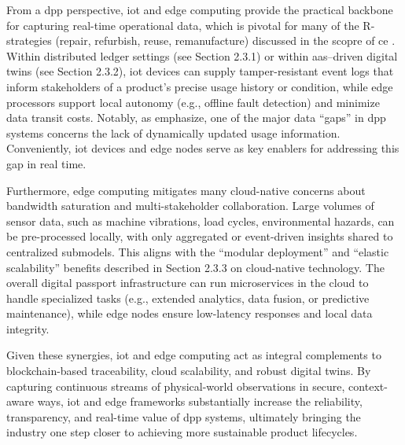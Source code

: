 From a \ac{dpp} perspective, \ac{iot} and edge computing provide the practical backbone for capturing real-time operational data, which is pivotal for many of the R-strategies (repair, refurbish, reuse, remanufacture) discussed in the scopre of \ac{ce} \autocite{DeutschesInstitutfurNormunge.V..2023}. Within distributed ledger settings (see Section 2.3.1) or within \ac{aas}–driven digital twins (see Section 2.3.2), \ac{iot} devices can supply tamper-resistant event logs that inform stakeholders of a product’s precise usage history or condition, while edge processors support local autonomy (e.g., offline fault detection) and minimize data transit costs. Notably, as \textcite{Kuhn.2025} emphasize, one of the major data “gaps” in \ac{dpp} systems concerns the lack of dynamically updated usage information. Conveniently, \ac{iot} devices and edge nodes serve as key enablers for addressing this gap in real time.

Furthermore, edge computing mitigates many cloud-native concerns about bandwidth saturation and multi-stakeholder collaboration. Large volumes of sensor data, such as machine vibrations, load cycles, environmental hazards, can be pre-processed locally, with only aggregated or event-driven insights shared to centralized submodels. This aligns with the “modular deployment” and “elastic scalability” benefits described in Section 2.3.3 on cloud-native technology. The overall digital passport infrastructure can run microservices in the cloud to handle specialized tasks (e.g., extended analytics, data fusion, or predictive maintenance), while edge nodes ensure low-latency responses and local data integrity. \autocite{Shi.2016, Burns.2016}

Given these synergies, \ac{iot} and edge computing act as integral complements to blockchain-based traceability, cloud scalability, and robust digital twins. By capturing continuous streams of physical-world observations in secure, context-aware ways, \ac{iot} and edge frameworks substantially increase the reliability, transparency, and real-time value of \ac{dpp} systems, ultimately bringing the industry one step closer to achieving more sustainable product lifecycles.

